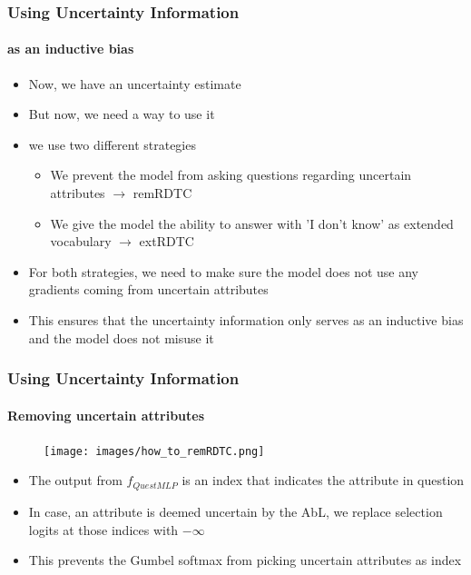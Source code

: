\documentclass[9pt]{beamer}
\begin{document}
\begin{frame}	
\frametitle{Using Uncertainty Information}
\framesubtitle{as an inductive bias}
\begin{itemize}
	\item Now, we have an uncertainty estimate
	\item But now, we need a way to use it
	\item we use two different strategies
	\begin{itemize}
		\item We prevent the model from asking questions regarding uncertain attributes $\rightarrow$ remRDTC
		\item We give the model the ability to answer with 'I don't know' as extended vocabulary $\rightarrow$ extRDTC
	\end{itemize}
	\item For both strategies, we need to make sure the model does not use any gradients coming from uncertain attributes
	\item This ensures that the uncertainty information only serves as an inductive bias and the model does not misuse it
\end{itemize}
\end{frame}


\begin{frame}
\frametitle{Using Uncertainty Information}
\framesubtitle{Removing uncertain attributes}
\begin{figure}
	\texttt{[image: images/how\_to\_remRDTC.png]}
\end{figure}
\begin{itemize}
	\item The output from $f_{QuestMLP}$ is an index that indicates the attribute in question
	\item In case, an attribute is deemed uncertain by the AbL, we replace selection logits at those indices with $-\infty$
	\item This prevents the Gumbel softmax from picking uncertain attributes as index
\end{itemize}
\end{frame}
\end{document}
